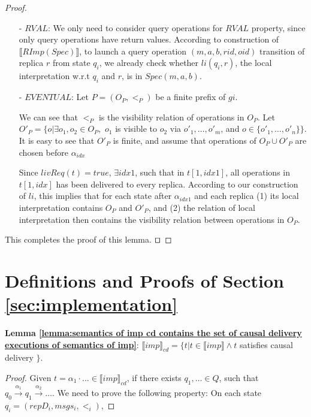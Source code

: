 {\begin {proof}
\begin{itemize}
\item[-] $\mathit{RVAL}$: We only need to consider query operations for $\mathit{RVAL}$ property, since only query operations have return values. According to construction of $\llbracket RImp(Spec) \rrbracket$, to launch a query operation $(m,a,b,rid,oid)$ transition of replica $r$ from state $q_i$, we already check whether $li(q_i,r)$, the local interpretation w.r.t $q_i$ and $r$, is in $Spec(m,a,b)$.

\item[-] $\mathit{EVENTUAL}$: Let $P=(O_P,<_P)$ be a finite prefix of $gi$.

We can see that $<_P$ is the visibility relation of operations in $O_P$. Let $O'_P = \{ o \vert \exists o_1,o_2 \in O_P,$ $o_1$ is visible to $o_2$ via $o'_1,\ldots,o'_m$, and $o \in \{ o'_1,\ldots,o'_n \} \}$. It is easy to see that $O'_P$ is finite, and assume that operations of $O_P \cup O'_P$ are chosen before $\alpha_{idx}$

Since $livReq(t)=true$, $\exists idx1$, such that in $t[1,idx1]$, all operations in $t[1,idx]$ has been delivered to every replica. According to our construction of $li$, this implies that for each state after $\alpha_{idx1}$ and each replica (1) its local interpretation contains $O_P$ and $O'_P$, and (2) the relation of local interpretation then contains the visibility relation between operations in $O_P$.
\end{itemize}

This completes the proof of this lemma. $\qed$
\end {proof}








\section{Definitions and Proofs of Section \ref{sec:implementation}}
\label{sec:appendix definitions and proofs of section implementation}



{\noindent \bf Lemma \ref{lemma:semantics of imp cd contains the set of causal delivery executions of semantics of imp}}: $\llbracket imp \rrbracket_{cd} = \{ t \vert t \in \llbracket imp \rrbracket \wedge t$ satisfies causal delivery $\}$.

\begin {proof}

Given $t = \alpha_1 \cdot \ldots \in \llbracket imp \rrbracket_{cd}$, if there exists $q_1,\ldots \in Q$, such that $q_0 {\xrightarrow{\alpha_1}} q_1 {\xrightarrow{\alpha_2}} \ldots$. We need to prove the following property: On each state $q_i=(repD_i,msgs_i,<_i)$,


\end{proof}}
